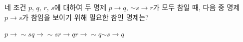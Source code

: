네 조건 $p$, $q$, $r$, $s$에 대하여 두 명제 $p\longrightarrow q$, ${\sim}s\longrightarrow r$가 모두 참일 때, 다음 중 명제 $p\longrightarrow s$가 참임을 보이기 위해 필요한 참인 명제는?
\begin{choices32}{$p\longrightarrow {\sim}s$}{$q\longrightarrow {\sim}s$}{$r\longrightarrow q$}{$r\longrightarrow {\sim}q$}{${\sim}s\longrightarrow q$}\end{choices32}
